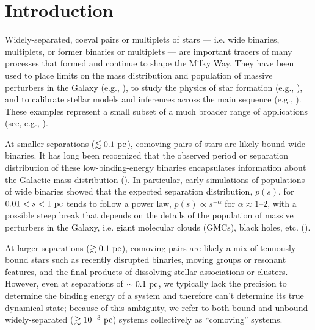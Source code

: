 \documentclass[modern, letterpaper]{aastex61}
\begin{document}

\section{Introduction}\label{sec:introduction}

Widely-separated, coeval pairs or multiplets of stars --- i.e. wide binaries,
multiplets, or former binaries or multiplets --- are important tracers of many
processes that formed and continue to shape the Milky Way.
They have been used to place limits on the mass distribution and population of
massive perturbers in the Galaxy (e.g., \citealt{Yoo:2004}), to study the
physics of star formation (e.g., \citealt{Parker:2009,Reipurth:2012}),
and to calibrate stellar models and inferences across the main sequence (e.g.,
\citealt{Brewer:2016}).
These examples represent a small subset of a much broader range of applications
(see, e.g., \citealt{Chaname:2007}).

At smaller separations ($\lesssim 0.1~\mathrm{pc}$), comoving pairs of stars are likely
bound wide binaries.
It has long been recognized that the observed period or separation distribution
of these low-binding-energy binaries encapsulates information about the
Galactic mass distribution (\citealt{Opik:1924,Oort:1950,Bahcall:1985}).
In particular, early simulations of populations of wide binaries showed that
the expected separation distribution, $p(s)$, for $0.01 < s < 1~\mathrm{pc}$ tends to
follow a power law, $p(s) \propto s^{-\alpha}$ for $\alpha \approx 1$--$2$,
with a possible steep break that depends on the details of the population of
massive perturbers in the Galaxy, i.e. giant molecular clouds (GMCs), black
holes, etc. (\citealt{Weinberg:1987}).

At larger separations ($\gtrsim 0.1~\mathrm{pc}$), comoving pairs are likely a mix of
tenuously bound stars such as recently disrupted binaries, moving groups or resonant
features, and the final products of dissolving stellar associations or
clusters.
However, even at separations of $\sim 0.1~\mathrm{pc}$, we typically lack the precision
to determine the binding energy of a system and therefore can't determine its
true dynamical state; because of this ambiguity, we refer to both bound and
unbound widely-separated ($\gtrsim 10^{-3}~\mathrm{pc}$) systems collectively as
``comoving'' systems.
\end{document}
